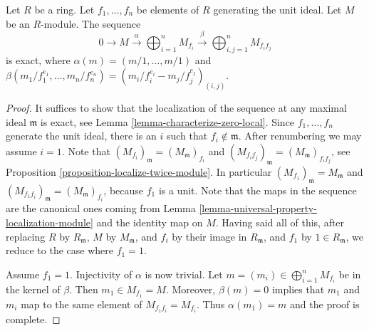 \begin{lemma}
\label{lemma-cover-module}
Let $R$ be a ring. Let $f_1, \ldots, f_n$ be elements of $R$
generating the unit ideal. Let $M$ be an $R$-module.
The sequence
$$
0 \to
M \xrightarrow{\alpha}
\bigoplus\nolimits_{i = 1}^n M_{f_i} \xrightarrow{\beta}
\bigoplus\nolimits_{i, j = 1}^n M_{f_i f_j}
$$
is exact, where $\alpha(m) = (m/1, \ldots, m/1)$
and $\beta(m_1/f_1^{e_1}, \ldots, m_n/f_n^{e_n})
= (m_i/f_i^{e_i} - m_j/f_j^{e_j})_{(i, j)}$.
\end{lemma}

\begin{proof}
It suffices to show that the localization of the sequence at
any maximal ideal $\mathfrak m$ is exact, see
Lemma \ref{lemma-characterize-zero-local}.
Since $f_1, \ldots, f_n$ generate the unit ideal,
there is an $i$ such that $f_i \not \in \mathfrak m$.
After renumbering we may assume $i = 1$.
Note that $(M_{f_i})_\mathfrak m = (M_\mathfrak m)_{f_i}$
and $(M_{f_if_j})_\mathfrak m = (M_\mathfrak m)_{f_if_j}$, see
Proposition \ref{proposition-localize-twice-module}.
In particular $(M_{f_1})_\mathfrak m = M_\mathfrak m$ and
$(M_{f_1 f_i})_\mathfrak m = (M_\mathfrak m)_{f_i}$, because
$f_1$ is a unit.
Note that the maps in the sequence are the canonical ones
coming from
Lemma \ref{lemma-universal-property-localization-module}
and the identity map on $M$.
Having said all of this, after replacing $R$ by $R_\mathfrak m$,
$M$ by $M_\mathfrak m$, and $f_i$ by their image in $R_\mathfrak m$,
and $f_1$ by $1 \in R_\mathfrak m$,
we reduce to the case where $f_1 = 1$.

\medskip\noindent
Assume $f_1 = 1$. Injectivity of $\alpha$ is now trivial. Let
$m = (m_i) \in \bigoplus_{i = 1}^n M_{f_i}$ be in the kernel of $\beta$.
Then $m_1 \in M_{f_1} = M$. Moreover, $\beta(m) = 0$
implies that $m_1$ and $m_i$ map to the same element of
$M_{f_1f_i} = M_{f_i}$. Thus $\alpha(m_1) = m$ and the
proof is complete.
\end{proof}